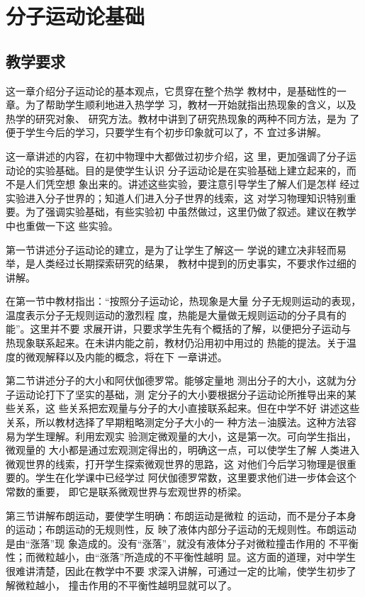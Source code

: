 
\chapter{分子运动论基础}
\minitoc[n]

\section{教学要求}
这一章介绍分子运动论的基本观点，它贯穿在整个热学
教材中，是基础性的一章。为了帮助学生顺利地进入热学学
习，教材一开始就指出热现象的含义，以及热学的研究对象、
研究方法。教材中讲到了研究热现象的两种不同方法，是为
了便于学生今后的学习，只要学生有个初步印象就可以了，不
宜过多讲解。

这一章讲述的内容，在初中物理中大都做过初步介绍，这
里，更加强调了分子运动论的实验基础。目的是使学生认识
分子运动论是在实验基础上建立起来的，而不是人们凭空想
象出来的。讲述这些实验，要注意引导学生了解人们是怎样
经过实验进入分子世界的；知道人们进入分子世界的线索，这
对学习物理知识特别重要。为了强调实验基础，有些实验初
中虽然做过，这里仍做了叙述。建议在教学中也重做一下这
些实验。

第一节讲述分子运动论的建立，是为了让学生了解这一
学说的建立决非轻而易举，是人类经过长期探索研究的结果，
教材中提到的历史事实，不要求作过细的讲解。

在第一节中教材指出：“按照分子运动论，热现象是大量
分子无规则运动的表现，温度表示分子无规则运动的激烈程
度，热能是大量做无规则运动的分子具有的能”。这里并不要
求展开讲，只要求学生先有个概括的了解，以便把分子运动与
热现象联系起来。在未讲内能之前，教材仍沿用初中用过的
热能的提法。关于温度的微观解释以及内能的概念，将在下
一章讲述。

第二节讲述分子的大小和阿伏伽德罗常。能够定量地
测出分子的大小，这就为分子运动论打下了坚实的基础，测
定分子的大小要根据分子运动论所推导出来的某些关系，这
些关系把宏观量与分子的大小直接联系起来。但在中学不好
讲述这些关系，所以教材选择了早期粗略测定分子大小的一
种方法－油膜法。这种方法容易为学生理解。利用宏观实
验测定微观量的大小，这是第一次。可向学生指出，微观量的
大小都是通过宏观测定得出的，明确这一点，可以使学生了解
人类进入微观世界的线索，打开学生探索微观世界的思路，这
对他们今后学习物理是很重要的。学生在化学课中已经学过
阿伏伽德罗常数，这里要求他们进一步体会这个常数的重要，
即它是联系微观世界与宏观世界的桥梁。

第三节讲解布朗运动，要使学生明确：布朗运动是微粒
的运动，而不是分子本身的运动；布朗运动的无规则性，反
映了液体内部分子运动的无规则性。布朗运动是由“涨落”现
象造成的。没有“涨落”，就没有液体分子对微粒撞击作用的
不平衡性；而微粒越小，由“涨落”所造成的不平衡性越明
显。这方面的道理，对中学生很难讲清楚，因此在教学中不要
求深入讲解，可通过一定的比喻，使学生初步了解微粒越小，
撞击作用的不平衡性越明显就可以了。

